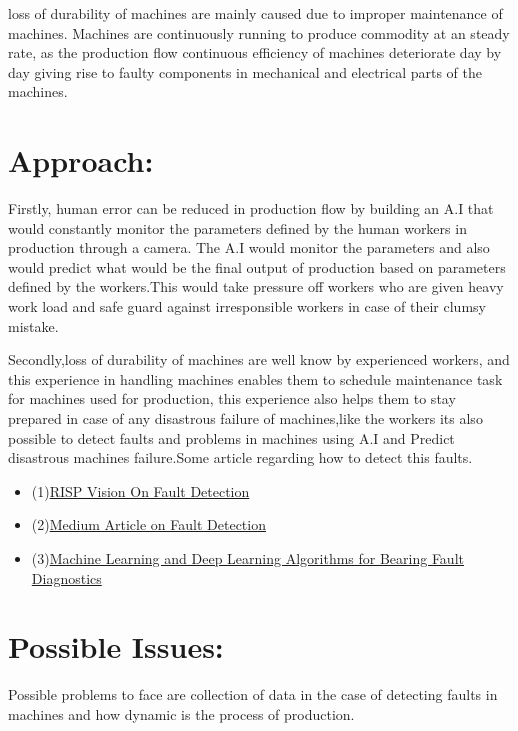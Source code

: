 \documentclass{article}
\begin{document}
\begin{normalsize}
      loss of durability of machines are mainly caused due to improper maintenance of machines. Machines are continuously running to produce commodity at an steady rate, as the production flow continuous efficiency of machines deteriorate day by day giving rise to faulty components in mechanical and electrical parts of the machines.
      
       \section{Approach:}
        
      Firstly, human error can be reduced in production flow by building an A.I that would constantly monitor the parameters defined by the human workers in production through a camera. The A.I would monitor the parameters and also would predict what would be the final output of production based on parameters defined by the workers.This would take pressure off workers who are given heavy work load and safe guard against irresponsible workers in case of their clumsy mistake. 
      
      Secondly,loss of durability of machines are well know by experienced workers, and this experience in handling machines enables them to schedule maintenance task for machines used for production, this experience also helps them to stay prepared in case of any disastrous failure of machines,like the workers its also possible to detect faults and problems in machines using A.I and Predict disastrous machines failure.Some article regarding how to detect this faults.
       
        \begin{itemize}
         
\item(1)\href{https://www.rsipvision.com/machine-fault-detection-and-classification/}{RISP Vision On Fault Detection} 
\item(2)\href{https://medium.com/bigdatarepublic/machine-learning-for-predictive-maintenance-where-to-start-5f3b7586acfb}{Medium Article on Fault Detection} 
\item(3)\href{https://arxiv.org/pdf/1901.08247.pdf}{Machine Learning and Deep Learning
Algorithms for Bearing Fault Diagnostics}

        \end{itemize}
        
      
        
    	\section{Possible Issues:}
        Possible problems to face are collection of data in the case of detecting faults in machines and how dynamic is the process of production.

\end{normalsize}
\end{document}
